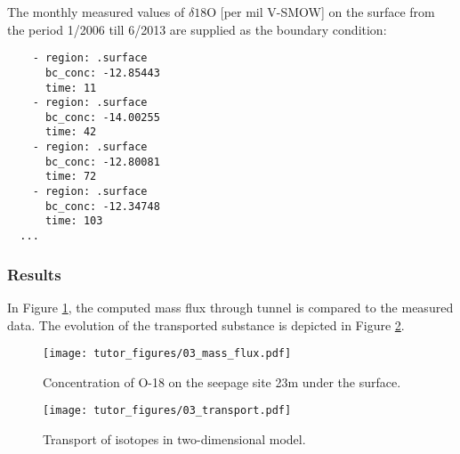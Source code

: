 The monthly measured values of \(\delta18\text{O}\) {[}per mil V-SMOW{]}
on the surface from the period 1/2006 till 6/2013 are supplied as the
boundary condition:

\begin{verbatim}
    - region: .surface
      bc_conc: -12.85443
      time: 11
    - region: .surface
      bc_conc: -14.00255
      time: 42
    - region: .surface
      bc_conc: -12.80081
      time: 72
    - region: .surface
      bc_conc: -12.34748
      time: 103
  ...
\end{verbatim}

\subsubsection{Results}

In Figure \ref{fig:conc_graph}, the computed mass flux through tunnel is
compared to the measured data. The evolution of the transported
substance is depicted in Figure \ref{fig:mass_real}.

\begin{figure}
\hypertarget{fig:conc_graph}{%
\centering
\texttt{[image: tutor\_figures/03\_mass\_flux.pdf]}
\caption{Concentration of O-18 on the seepage site 23m under the
surface.}\label{fig:conc_graph}
}
\end{figure}

\begin{figure}
\hypertarget{fig:mass_real}{%
\centering
\texttt{[image: tutor\_figures/03\_transport.pdf]}
\caption{Transport of isotopes in two-dimensional
model.}\label{fig:mass_real}
}
\end{figure}
